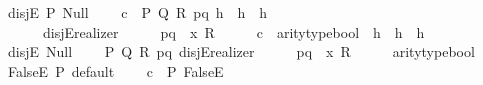 \begin{isabellebody}
\isanewline
\ \ disjE\ {\isacharparenleft}{\kern0pt}P{\isacharparenright}{\kern0pt}{\isacharcolon}{\kern0pt}\ {\isachardoublequoteopen}Null{\isachardoublequoteclose}\isanewline
\ \ \ \ {\isachardoublequoteopen}\isactrlbold {\isasymlambda}{\isacharparenleft}{\kern0pt}c{\isacharcolon}{\kern0pt}\ {\isacharunderscore}{\kern0pt}{\isacharparenright}{\kern0pt}\ P\ Q\ R\ pq\ {\isacharparenleft}{\kern0pt}h{}{\isacharcolon}{\kern0pt}\ {\isacharunderscore}{\kern0pt}{\isacharparenright}{\kern0pt}\ {\isacharparenleft}{\kern0pt}h{}{\isacharcolon}{\kern0pt}\ {\isacharunderscore}{\kern0pt}{\isacharparenright}{\kern0pt}\ {\isacharparenleft}{\kern0pt}h{}{\isacharcolon}{\kern0pt}\ {\isacharunderscore}{\kern0pt}{\isacharparenright}{\kern0pt}{\isachardot}{\kern0pt}\isanewline
\ \ \ \ \ \ \ disjE{\isacharunderscore}{\kern0pt}realizer{}\ {\isasymcdot}\ {\isacharunderscore}{\kern0pt}\ {\isasymcdot}\ {\isacharunderscore}{\kern0pt}\ {\isasymcdot}\ pq\ {\isasymcdot}\ {\isacharparenleft}{\kern0pt}{\isasymlambda}x{\isachardot}{\kern0pt}\ R{\isacharparenright}{\kern0pt}\ {\isasymcdot}\ {\isacharunderscore}{\kern0pt}\ {\isasymcdot}\ {\isacharunderscore}{\kern0pt}\ {\isasymbullet}\ c\ {\isasymbullet}\ arity{\isacharunderscore}{\kern0pt}type{\isacharunderscore}{\kern0pt}bool\ {\isasymbullet}\ h{}\ {\isasymbullet}\ h{}\ {\isasymbullet}\ h{}{\isachardoublequoteclose}\isanewline
\isanewline
\ \ disjE{\isacharcolon}{\kern0pt}\ {\isachardoublequoteopen}Null{\isachardoublequoteclose}\isanewline
\ \ \ \ {\isachardoublequoteopen}\isactrlbold {\isasymlambda}P\ Q\ R\ pq{\isachardot}{\kern0pt}\ disjE{\isacharunderscore}{\kern0pt}realizer{}\ {\isasymcdot}\ {\isacharunderscore}{\kern0pt}\ {\isasymcdot}\ {\isacharunderscore}{\kern0pt}\ {\isasymcdot}\ pq\ {\isasymcdot}\ {\isacharparenleft}{\kern0pt}{\isasymlambda}x{\isachardot}{\kern0pt}\ R{\isacharparenright}{\kern0pt}\ {\isasymcdot}\ {\isacharunderscore}{\kern0pt}\ {\isasymcdot}\ {\isacharunderscore}{\kern0pt}\ {\isasymbullet}\ arity{\isacharunderscore}{\kern0pt}type{\isacharunderscore}{\kern0pt}bool{\isachardoublequoteclose}\isanewline
\isanewline
\ \ FalseE\ {\isacharparenleft}{\kern0pt}P{\isacharparenright}{\kern0pt}{\isacharcolon}{\kern0pt}\ {\isachardoublequoteopen}default{\isachardoublequoteclose}\isanewline
\ \ \ \ {\isachardoublequoteopen}\isactrlbold {\isasymlambda}{\isacharparenleft}{\kern0pt}c{\isacharcolon}{\kern0pt}\ {\isacharunderscore}{\kern0pt}{\isacharparenright}{\kern0pt}\ P{\isachardot}{\kern0pt}\ FalseE\ {\isasymcdot}\ {\isacharunderscore}{\kern0pt}{\isachardoublequoteclose}\isanewline

\end{isabellebody}
